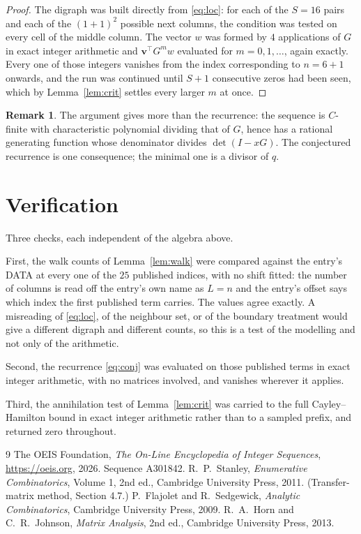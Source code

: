 \documentclass[11pt,a4paper]{article}
\theoremstyle{plain}
\theoremstyle{definition}
\newtheorem{remark}[theorem]{Remark}
\begin{document}
\begin{proof}
The digraph was built directly from \eqref{eq:loc}: for each of the $S=16$ pairs and each
of the $(1+1)^{2}$ possible next columns, the condition was tested on every cell of
the middle column. The vector $w$ was formed by $4$ applications of $G$ in exact integer
arithmetic and $\mathbf{v}^{\!\top}G^{m}w$ evaluated for $m=0,1,\dots$, again exactly.
Every one of those integers vanishes from the index corresponding to $n=6+1$ onwards,
and the run was continued until $S+1$ consecutive zeros had been seen, which by
Lemma~\ref{lem:crit} settles every larger $m$ at once.
\end{proof}

\begin{remark}
The argument gives more than the recurrence: the sequence is $C$-finite with characteristic
polynomial dividing that of $G$, hence has a rational generating function whose denominator
divides $\det(I-xG)$. The conjectured recurrence is one consequence; the minimal one is a
divisor of $q$.
\end{remark}

\section{Verification}

Three checks, each independent of the algebra above.

First, the walk counts of Lemma~\ref{lem:walk} were compared against the entry's DATA at
every one of the $25$ published indices, with no shift fitted: the number of columns is
read off the entry's own name as $L=n$ and the entry's offset says which index the first
published term carries. The values agree exactly. A misreading of \eqref{eq:loc}, of the
neighbour set, or of the boundary treatment would give a different digraph and different
counts, so this is a test of the modelling and not only of the arithmetic.

Second, the recurrence \eqref{eq:conj} was evaluated on those published terms in exact
integer arithmetic, with no matrices involved, and vanishes wherever it applies.

Third, the annihilation test of Lemma~\ref{lem:crit} was carried to the full
Cayley--Hamilton bound in exact integer arithmetic rather than to a sampled prefix, and
returned zero throughout.

\begin{thebibliography}{9}
 The OEIS Foundation, \emph{The On-Line Encyclopedia of Integer
Sequences}, \url{https://oeis.org}, 2026. Sequence A301842.
 R.~P.~Stanley, \emph{Enumerative Combinatorics}, Volume 1, 2nd ed.,
Cambridge University Press, 2011. (Transfer-matrix method, Section 4.7.)
 P.~Flajolet and R.~Sedgewick, \emph{Analytic Combinatorics}, Cambridge
University Press, 2009.
 R.~A.~Horn and C.~R.~Johnson, \emph{Matrix Analysis}, 2nd ed., Cambridge
University Press, 2013.
\end{thebibliography}
\end{document}
